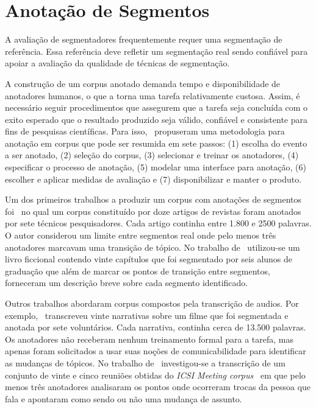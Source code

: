 \section{Anotação de Segmentos}
\label{sec:anotacoes}
A avaliação de segmentadores frequentemente requer uma segmentação de referência. Essa referência deve refletir um segmentação real sendo confiável para apoiar a avaliação da qualidade de técnicas de segmentação. 

A construção de um corpus anotado demanda tempo e disponibilidade de anotadores humanos, o que a torna uma tarefa relativamente custosa. 
Assim, é necessário seguir procedimentos que assegurem que a tarefa seja concluída com o exito esperado que o resultado produzido seja válido, confiável e consistente para fins de pesquisas científicas. Para isso,~\cite{Hovy2010} propuseram uma metodologia para anotação em corpus que pode ser resumida em sete passos: 
(1) escolha do evento a ser anotado, %
(2) seleção do corpus, %
(3) selecionar e treinar os anotadores,
(4) especificar o processo de anotação,
(5) modelar uma interface para anotação,
(6) escolher e aplicar medidas de avaliação e 
(7) disponibilizar e manter o produto.
% 

Um dos primeiros trabalhos a produzir um corpus com anotações de segmentos foi~\cite{Hearst1997} no qual um corpus constituído por doze artigos de revistas foram anotados por sete técnicos pesquisadores. Cada artigo continha entre 1.800 e 2500 palavras. O autor considerou um limite entre segmentos real onde pelo menos três anotadores marcavam uma transição de tópico. No trabalho de~\cite{Kazantseva2012} utilizou-se um livro ficcional contendo vinte capítulos que foi segmentado por seis alunos de graduação que além de marcar os pontos de transição entre segmentos, forneceram um descrição breve sobre cada segmento identificado. 

Outros trabalhos abordaram corpus compostos pela transcrição de audios. Por exemplo,~\cite{Passonneau1997} transcreveu vinte narrativas sobre um filme que foi segmentada e anotada por sete voluntários. Cada narrativa, continha cerca de 13.500 palavras. Os anotadores não receberam nenhum treinamento formal para a tarefa, mas apenas foram solicitados a usar suas noções de comunicabilidade para identificar as mudanças de tópicos. No trabalho de~\cite{Galley2003} investigou-se a transcrição de um conjunto de vinte e cinco reuniões obtidas do \textit{ICSI Meeting corpus}~\cite{Janin2003} em que pelo menos três anotadores analisaram os pontos onde ocorreram trocas da pessoa que fala e apontaram como sendo ou não uma mudança de assunto.  


